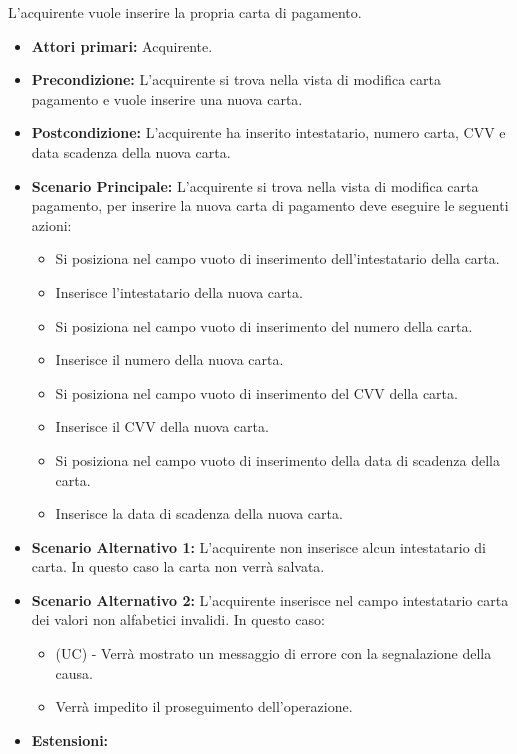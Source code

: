 L'acquirente vuole inserire la propria carta di pagamento.
\begin{itemize}
    \item \textbf{Attori primari:} Acquirente.
    \item \textbf{Precondizione:} L'acquirente si trova nella vista di modifica carta pagamento e vuole inserire una nuova carta.
    \item \textbf{Postcondizione:} L'acquirente ha inserito intestatario, numero carta, CVV e data scadenza della nuova carta.
    \item \textbf{Scenario Principale:} L'acquirente si trova nella vista di modifica carta pagamento, per inserire la nuova carta di pagamento deve eseguire le seguenti azioni:
        \begin{itemize}
            \item Si posiziona nel campo vuoto di inserimento dell'intestatario della carta.
            \item Inserisce l'intestatario della nuova carta.
            \item Si posiziona nel campo vuoto di inserimento del numero della carta.
            \item Inserisce il numero della nuova carta.
            \item Si posiziona nel campo vuoto di inserimento del CVV della carta.
            \item Inserisce il CVV della nuova carta.
            \item Si posiziona nel campo vuoto di inserimento della data di scadenza della carta.
            \item Inserisce la data di scadenza della nuova carta.
        \end{itemize}
    \item \textbf{Scenario Alternativo 1:} L'acquirente non inserisce alcun intestatario di carta. In questo caso la carta non verrà salvata.
    \item \textbf{Scenario Alternativo 2:} L'acquirente inserisce nel campo intestatario carta dei valori non alfabetici invalidi. In questo caso:
    \begin{itemize}
        \item (UC) - Verrà mostrato un messaggio di errore con la segnalazione della causa.
        \item Verrà impedito il proseguimento dell'operazione.
    \end{itemize}    
    \item \textbf{Estensioni:}

\end{itemize}
